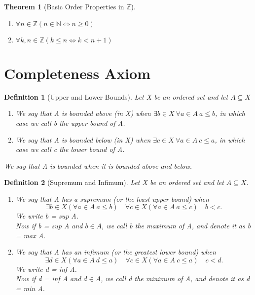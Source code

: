 \documentclass[11pt, oneside]{book}
\theoremstyle{break}
\newtheorem{thm}{Theorem}[section]
\newtheorem{defn}{Definition}[section]
\newcommand{\bb}[1]{\mathbb{#1}}		%
\begin{document}
\begin{thm}[Basic Order Properties in $\bb{Z}$]
	\begin{enumerate}
		\item $\forall n \in \bb{Z} (n \in \bb{N} \iff n \geq 0)$
		\item $\forall k, n \in \bb{Z} (k \leq n \iff k < n + 1)$
	\end{enumerate}
\end{thm}


\section{Completeness Axiom}

\begin{defn}[Upper and Lower Bounds]
	Let X be an ordered set and let $A \subseteq X$
	\begin{enumerate}
		\item We say that A is bounded above (in X) when $\exists b \in X \> \forall a \in A \> a \leq b$, in which case we call b the upper bound of A.
		\item We say that A is bounded below (in X) when $\exists c \in X \> \forall a \in A \> c \leq a$, in which case we call c the lower bound of A.
	\end{enumerate}
	We say that A is bounded when it is bounded above and below.
\end{defn}

\begin{defn}[Supremum and Infimum]
	Let X be an ordered set and let $A \subseteq X$.
	\begin{enumerate}
		\item We say that A has a supremum (or the least upper bound) when
			\[
				\exists b \in X (\forall a \in A \> a \leq b) \quad \forall c \in X (\forall a \in A \> a \leq c) \quad b < c.
			\]
			We write b = sup A. \\
			Now if b = sup A and $b \in A$, we call b the maximum of A, and denote it as b = max A. \\
		\item We say that A has an infimum (or the greatest lower bound) when
			\[
				\exists d \in X (\forall a \in A \> d \leq a) \quad \forall c \in X (\forall a \in A \> c \leq a) \quad c < d.
			\]
			We write d = inf A. \\
			Now if d = inf A and $d \in A$, we call d the minimum of A, and denote it as d = min A.
	\end{enumerate}
\end{defn}
\end{document}
